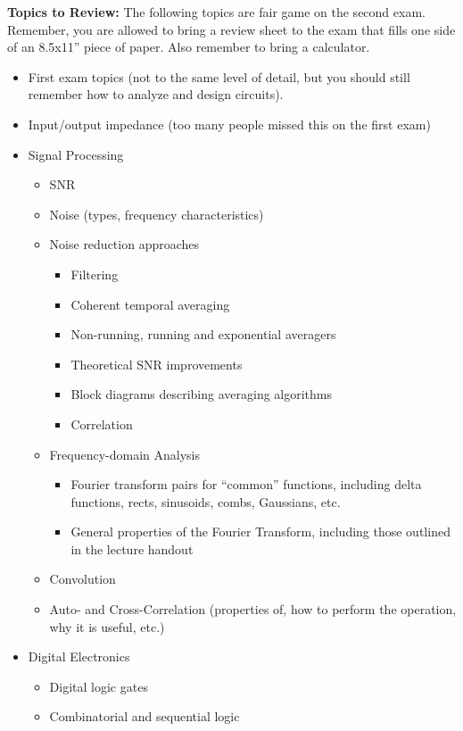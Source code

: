 \documentclass[10pt]{report}
\begin{document}
{\bf Topics to Review:} The following topics are fair game on the second exam.
Remember, you are allowed to bring a review sheet to the exam that fills one
side of an 8.5x11'' piece of paper.  Also remember to bring a calculator.

\begin{itemize}
\item First exam topics (not to the same level of detail, but you should still
remember how to analyze and design circuits).
\item Input/output impedance (too many people missed this on the first exam)
\item Signal Processing
\begin{itemize}
    \item SNR
    \item Noise (types, frequency characteristics)
    \item Noise reduction approaches
    \begin{itemize}
        \item Filtering
        \item Coherent temporal averaging
        \item Non-running, running and exponential averagers
        \item Theoretical SNR improvements
        \item Block diagrams describing averaging algorithms
        \item Correlation
    \end{itemize}
    \item Frequency-domain Analysis
    \begin{itemize}
        \item Fourier transform pairs for ``common'' functions, including delta functions, rects, sinusoids, combs, Gaussians, etc.
        \item General properties of the Fourier Transform, including those outlined in the lecture handout
    \end{itemize}
    \item Convolution
    \item Auto- and Cross-Correlation (properties of, how to perform the operation, why it is useful, etc.)
\end{itemize}
\item Digital Electronics
\begin{itemize}
    \item Digital logic gates
    \item Combinatorial and sequential logic

\end{itemize}
\end{itemize}
\end{document}
